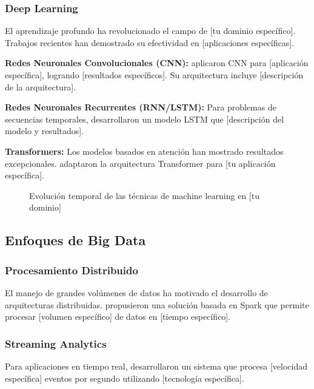 \subsubsection{Deep Learning}

El aprendizaje profundo ha revolucionado el campo de [tu dominio específico]. Trabajos recientes han demostrado su efectividad en [aplicaciones específicas].

\textbf{Redes Neuronales Convolucionales (CNN):}
\citet{autor2022} aplicaron CNN para [aplicación específica], logrando [resultados específicos]. Su arquitectura incluye [descripción de la arquitectura].

\textbf{Redes Neuronales Recurrentes (RNN/LSTM):}
Para problemas de secuencias temporales, \citet{autor2023} desarrollaron un modelo LSTM que [descripción del modelo y resultados].

\textbf{Transformers:}
Los modelos basados en atención han mostrado resultados excepcionales. \citet{autor2024} adaptaron la arquitectura Transformer para [tu aplicación específica].

\begin{figure}[htbp]
\centering
\caption{Evolución temporal de las técnicas de machine learning en [tu dominio]}
\label{fig:timeline_ml}
\end{figure}

\subsection{Enfoques de Big Data}

\subsubsection{Procesamiento Distribuido}

El manejo de grandes volúmenes de datos ha motivado el desarrollo de arquitecturas distribuidas. \citet{autor2021_bigdata} propusieron una solución basada en Spark que permite procesar [volumen específico] de datos en [tiempo específico].

\subsubsection{Streaming Analytics}

Para aplicaciones en tiempo real, \citet{autor2022_streaming} desarrollaron un sistema que procesa [velocidad específica] eventos por segundo utilizando [tecnología específica].

